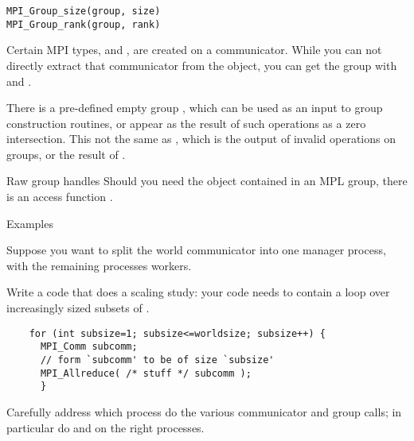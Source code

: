 \begin{lstlisting}
MPI_Group_size(group, size)
MPI_Group_rank(group, rank)
\end{lstlisting}

Certain MPI types,  and ,
are created on a communicator.
While you can not directly extract that communicator from the object,
you can get the group with
 and .

There is a pre-defined empty group ,
which can be used as an input to group construction routines,
or appear as the result of such operations as a zero intersection.
This not the same as ,
which is the output of invalid operations on groups,
or the result of .

\begin{mplnote}{Raw group handles}
  Should you need the  object
  contained in an MPL group,
  there is an access function .
\end{mplnote}

 {Examples}

Suppose you want to split the world communicator into
one manager process, with the remaining processes workers.
%

\begin{exercise}[subgroup]
  \label{ex:comm-saling}
  Write a code that does a scaling study: your code needs to
  contain a loop over increasingly sized subsets of .
  \begin{lstlisting}
    for (int subsize=1; subsize<=worldsize; subsize++) {
      MPI_Comm subcomm;
      // form `subcomm' to be of size `subsize'
      MPI_Allreduce( /* stuff */ subcomm );
      }
  \end{lstlisting}
  Carefully address which process do the various communicator and group calls;
  in particular do  and 
  on the right processes.
\end{exercise}
